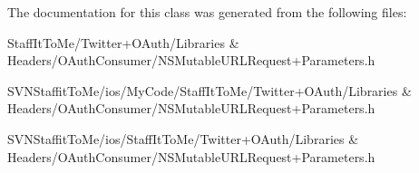 \-The documentation for this class was generated from the following files\-:\begin{DoxyCompactItemize}
\item 
\-Staff\-It\-To\-Me/\-Twitter+\-O\-Auth/\-Libraries \& Headers/\-O\-Auth\-Consumer/\-N\-S\-Mutable\-U\-R\-L\-Request+\-Parameters.\-h\item 
\-S\-V\-N\-Staffit\-To\-Me/ios/\-My\-Code/\-Staff\-It\-To\-Me/\-Twitter+\-O\-Auth/\-Libraries \& Headers/\-O\-Auth\-Consumer/\-N\-S\-Mutable\-U\-R\-L\-Request+\-Parameters.\-h\item 
\-S\-V\-N\-Staffit\-To\-Me/ios/\-Staff\-It\-To\-Me/\-Twitter+\-O\-Auth/\-Libraries \& Headers/\-O\-Auth\-Consumer/\-N\-S\-Mutable\-U\-R\-L\-Request+\-Parameters.\-h\end{DoxyCompactItemize}
